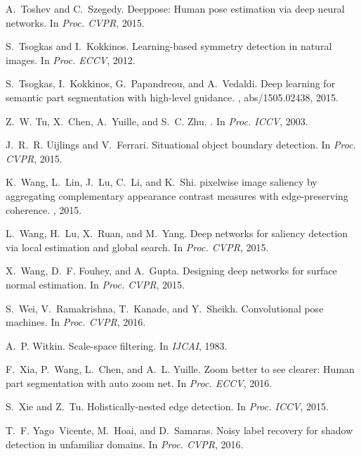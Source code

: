 \documentclass[10pt,twocolumn,letterpaper]{article}
\begin{document}
\begin{thebibliography}{100}
	A.~Toshev and C.~Szegedy.
	\newblock Deeppose: Human pose estimation via deep neural networks.
	\newblock In {\em Proc. {CVPR}}, 2015.
	
	S.~Tsogkas and I.~Kokkinos.
	\newblock Learning-based symmetry detection in natural images.
	\newblock In {\em Proc. {ECCV}}, 2012.
	
	S.~Tsogkas, I.~Kokkinos, G.~Papandreou, and A.~Vedaldi.
	\newblock Deep learning for semantic part segmentation with high-level
	guidance.
	, abs/1505.02438, 2015.
	
	Z.~W. Tu, X.~Chen, A.~Yuille, and S.~C. Zhu.
	.
	\newblock In {\em Proc. {ICCV}}, 2003.
	
	J.~R.~R. Uijlings and V.~Ferrari.
	\newblock Situational object boundary detection.
	\newblock In {\em Proc. {CVPR}}, 2015.
	
	K.~Wang, L.~Lin, J.~Lu, C.~Li, and K.~Shi.
	 pixelwise image saliency by aggregating complementary
	appearance contrast measures with edge-preserving coherence.
	, 2015.
	
	L.~Wang, H.~Lu, X.~Ruan, and M.~Yang.
	\newblock Deep networks for saliency detection via local estimation and global
	search.
	\newblock In {\em Proc. {CVPR}}, 2015.
	
	X.~Wang, D.~F. Fouhey, and A.~Gupta.
	\newblock Designing deep networks for surface normal estimation.
	\newblock In {\em Proc. {CVPR}}, 2015.
	
	S.~Wei, V.~Ramakrishna, T.~Kanade, and Y.~Sheikh.
	\newblock Convolutional pose machines.
	\newblock In {\em Proc. {CVPR}}, 2016.
	
	A.~P. Witkin.
	\newblock Scale-space filtering.
	\newblock In {\em IJCAI}, 1983.
	
	F.~Xia, P.~Wang, L.~Chen, and A.~L. Yuille.
	\newblock Zoom better to see clearer: Human part segmentation with auto zoom
	net.
	\newblock In {\em Proc. {ECCV}}, 2016.
	
	S.~Xie and Z.~Tu.
	\newblock Holistically-nested edge detection.
	\newblock In {\em Proc. {ICCV}}, 2015.
	
	T.~F. Yago~Vicente, M.~Hoai, and D.~Samaras.
	\newblock Noisy label recovery for shadow detection in unfamiliar domains.
	\newblock In {\em Proc. {CVPR}}, 2016.
	

\end{thebibliography}
\end{document}

